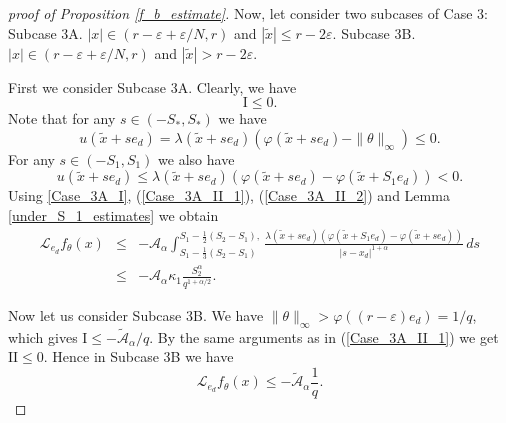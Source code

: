 \documentclass[a4paper,12pt,reqno]{amsart}
\theoremstyle{definition}
\theoremstyle{remark}
\newcommand{\eps}{\varepsilon}
\newcommand{\calA}{\mathcal{A}}
\newcommand{\calL}{\mathcal{L}}
\begin{document}
\begin{proof}[proof of Proposition \ref{f_b_estimate}]
Now, let consider two subcases of Case 3:\newline
Subcase 3A. $|x| \in (r - \eps + \eps/N, r)$ and $|\tilde{x}| \le r - 2 \eps$.\newline
Subcase 3B. $|x| \in (r - \eps + \eps/N, r)$ and $|\tilde{x}| > r - 2 \eps$.

First we consider Subcase 3A. 
Clearly, we have 
\begin{equation}
\label{Case_3A_I}
\text{I} \le 0.
\end{equation} 
Note that for any $s \in (-S_*,S_*)$ we have
\begin{equation}
\label{Case_3A_II_1}
u(\tilde{x} + s e_d) =
 \lambda(\tilde{x} + s e_d) \left(\varphi(\tilde{x} + s e_d) - \|\theta\|_{\infty} \right) \le 0.
\end{equation}
For any $s \in (-S_1,S_1)$ we also have
\begin{equation}
\label{Case_3A_II_2}
u(\tilde{x} + s e_d) \le  \lambda(\tilde{x} + s e_d) \left(\varphi(\tilde{x} + s e_d) - \varphi(\tilde{x} + S_1 e_d)\right) < 0.
\end{equation}
Using  \eqref{Case_3A_I}, (\ref{Case_3A_II_1}), (\ref{Case_3A_II_2}) and Lemma \ref{under_S_1_estimates} we obtain
\begin{eqnarray}
\nonumber
\calL_{e_d} f_{\theta}(x)
&\le &\nonumber
-\calA_{\alpha}  \int_{S_1 - \frac 13(S_2-S_1)}^{S_1 - \frac 12(S_2-S_1),}
\frac{\lambda(\tilde{x} + s e_d) (\varphi(\tilde{x} + S_1 e_d) - \varphi(\tilde{x} + s e_d))}{|s - x_d|^{1 + \alpha}} \, ds\\
&\le& - \calA_{\alpha} \kappa_1 \frac{S_2^\alpha}{q^{1+\alpha/2}}.
\label{Case_2A_II_3}
\end{eqnarray}

Now let us consider Subcase 3B. 
%
We have $\|\theta\|_\infty > \varphi((r - \eps) e_d) = 1/q $, which gives  
$\text{I} \le - \tilde{\calA}_{\alpha}/q$.
By the same arguments as in (\ref{Case_3A_II_1}) we get 
$\text{II} \le 0$.
Hence in Subcase 3B we have 
\begin{equation}
\label{Case_3B}
\calL_{e_d} f_{\theta}(x) \le - \tilde{\calA}_{\alpha}  \frac{1}{q}.\end{equation} 


\end{proof}
\end{document}
